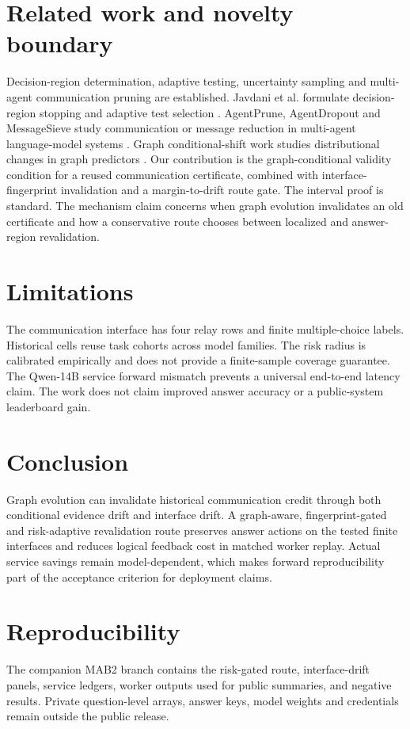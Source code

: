 \documentclass[11pt]{article}
\begin{document}
\section{Related work and novelty boundary}
Decision-region determination, adaptive testing, uncertainty sampling and multi-agent communication pruning are established. Javdani et al. formulate decision-region stopping and adaptive test selection \cite{javdani}. AgentPrune, AgentDropout and MessageSieve study communication or message reduction in multi-agent language-model systems \cite{agentprune,agentdropout,messagesieve}. Graph conditional-shift work studies distributional changes in graph predictors \cite{graces}. Our contribution is the graph-conditional validity condition for a reused communication certificate, combined with interface-fingerprint invalidation and a margin-to-drift route gate. The interval proof is standard. The mechanism claim concerns when graph evolution invalidates an old certificate and how a conservative route chooses between localized and answer-region revalidation.

\section{Limitations}
The communication interface has four relay rows and finite multiple-choice labels. Historical cells reuse task cohorts across model families. The risk radius is calibrated empirically and does not provide a finite-sample coverage guarantee. The Qwen-14B service forward mismatch prevents a universal end-to-end latency claim. The work does not claim improved answer accuracy or a public-system leaderboard gain.

\section{Conclusion}
Graph evolution can invalidate historical communication credit through both conditional evidence drift and interface drift. A graph-aware, fingerprint-gated and risk-adaptive revalidation route preserves answer actions on the tested finite interfaces and reduces logical feedback cost in matched worker replay. Actual service savings remain model-dependent, which makes forward reproducibility part of the acceptance criterion for deployment claims.

\section*{Reproducibility}
The companion MAB2 branch contains the risk-gated route, interface-drift panels, service ledgers, worker outputs used for public summaries, and negative results. Private question-level arrays, answer keys, model weights and credentials remain outside the public release.
\end{document}
